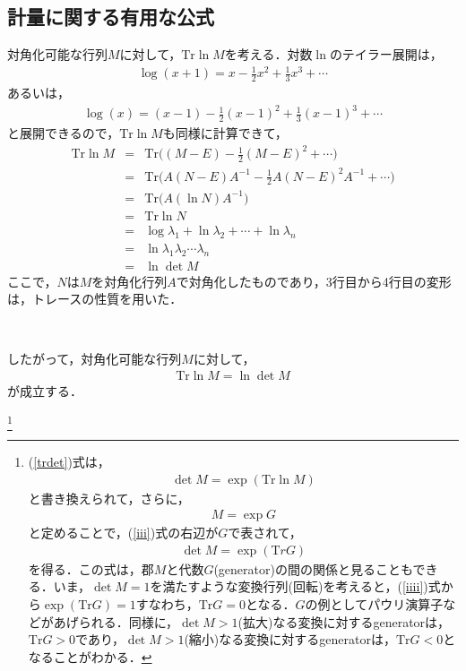 \subsection{計量に関する有用な公式}
対角化可能な行列$M$に対して，$\mathrm{Tr}\ln M$を考える．対数$\ln$のテイラー展開は，
\begin{eqnarray}
\log(x+1)=x-\frac{1}{2}x^2+\frac{1}{3}x^3+\cdots
\end{eqnarray}
あるいは，
\begin{eqnarray}
\log(x)=(x-1)-\frac{1}{2}(x-1)^2+\frac{1}{3}(x-1)^3+\cdots
\end{eqnarray}
と展開できるので，$\mathrm{Tr}\ln M$も同様に計算できて，
\begin{eqnarray}
\mathrm{Tr}\ln M&=&\mathrm{Tr}\biggl((M-E)-\frac{1}{2}(M-E)^2+\cdots\biggr) \nonumber \\
&=&\mathrm{Tr}\biggl(A(N-E)A^{-1}-\frac{1}{2}A(N-E)^2A^{-1}+\cdots\biggr) \nonumber \\
&=&\mathrm{Tr}\biggl(A(\ln N)A^{-1}\biggr) \nonumber \\
&=&\mathrm{Tr}\ln N \nonumber \\
&=&\log\lambda_1+\ln\lambda_2+\cdots+\ln\lambda_n \nonumber \\
&=&\ln\lambda_1\lambda_2\cdots\lambda_n \nonumber \\
&=&\ln\det M
\end{eqnarray}
ここで，$N$は$M$を対角化行列$A$で対角化したものであり，3行目から4行目の変形は，トレースの性質を用いた．
\begin{empheqboxed}
\

したがって，対角化可能な行列$M$に対して，
\begin{eqnarray}
\label{trdet}
\mathrm{Tr} \ln M=\ln \det M
\end{eqnarray}が成立する．
\end{empheqboxed}
\footnote{
(\ref{trdet})式は，
\begin{eqnarray}
\label{iii}
\det M=\exp(\mathrm{Tr}\ln M)
\end{eqnarray}
と書き換えられて，さらに，
\begin{eqnarray}
M=\exp G
\end{eqnarray}
と定めることで，(\ref{iii})式の右辺が$G$で表されて，
\begin{eqnarray}
\label{iiii}
\det M=\exp(\mathrm Tr G)
\end{eqnarray}を得る．この式は，郡$M$と代数$G$(generator)の間の関係と見ることもできる．いま，$\det M=1$を満たすような変換行列(回転)を考えると，(\ref{iiii})式から$\exp(\mathrm{Tr} G)=1$すなわち，$\mathrm{Tr} G=0$となる．$G$の例としてパウリ演算子などがあげられる．同様に，$\det M>1$(拡大)なる変換に対するgeneratorは，$\mathrm{Tr} G>0$であり，$\det M>1$(縮小)なる変換に対するgeneratorは，$\mathrm{Tr} G<0$となることがわかる．}

